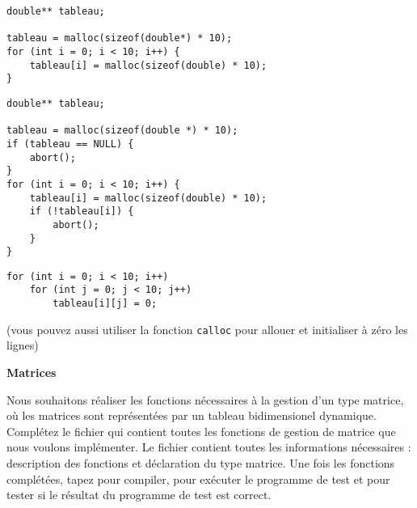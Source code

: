 \documentclass[10pt]{article}\usepackage[enonce]{exemptty}
\begin{document}
\begin{Verbatim}[label=Exemple: allocation d'un tableau de 10*10 doubles (sans aucune vérification)]
double** tableau;

tableau = malloc(sizeof(double*) * 10);
for (int i = 0; i < 10; i++) {
    tableau[i] = malloc(sizeof(double) * 10);
}
\end{Verbatim}

\noindent\begin{minipage}{.64\linewidth}
\begin{Verbatim}[label=Idem avec gestion des erreurs]
double** tableau;

tableau = malloc(sizeof(double *) * 10);
if (tableau == NULL) {
    abort();
}
for (int i = 0; i < 10; i++) {
    tableau[i] = malloc(sizeof(double) * 10);
    if (!tableau[i]) {
        abort();
    }
}
\end{Verbatim}
\end{minipage}
\hfill
\begin{minipage}{.35\linewidth}
\begin{Verbatim}[label=Initialisation des éléments,numbers=right]    
for (int i = 0; i < 10; i++)
    for (int j = 0; j < 10; j++)
        tableau[i][j] = 0;
\end{Verbatim}

(vous pouvez aussi utiliser la fonction \verb~calloc~ pour allouer et initialiser à zéro les lignes)
\end{minipage}

\medskip

\clearpage


\begin{Exercice} \textbf{Matrices}

  Nous souhaitons réaliser les fonctions nécessaires à la gestion d'un type
  matrice, où les matrices sont représentées par un tableau bidimensionel
  dynamique. Complétez le fichier  qui contient toutes les
  fonctions de gestion de matrice que nous voulons implémenter. Le fichier
   contient toutes les informations nécessaires : description
  des fonctions et déclaration du type matrice. Une fois les fonctions
  complétées, tapez  pour compiler,
   pour exécuter le programme de test et  pour tester si le résultat du programme de test est correct.
\end{Exercice}
\end{document}
